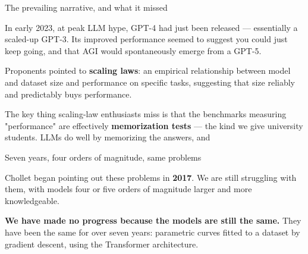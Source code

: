 \documentclass[aspectratio=169,11pt,t]{beamer}
\begin{document}
\begin{frame}[shrink=25]{The prevailing narrative, and what it missed}
{\fontsize{9.4}{12.6}\selectfont\color{fg2}In early 2023, at peak LLM hype, GPT-4 had just been released --- essentially a scaled-up GPT-3. Its improved performance seemed to suggest you could just keep going, and that AGI would spontaneously emerge from a GPT-5.\par}\vskip 4pt
{\fontsize{9.4}{12.6}\selectfont\color{fg2}Proponents pointed to \textbf{scaling laws}: an empirical relationship between model and dataset size and performance on specific tasks, suggesting that size reliably and predictably buys performance.\par}\vskip 4pt
\begin{iband}[signal]
The key thing scaling-law enthusiasts miss is that the benchmarks measuring "performance" are effectively \textbf{memorization tests} --- the kind we give university students. LLMs do well by memorizing the answers, and 
\end{iband}
\end{frame}

\begin{frame}[shrink=25]{Seven years, four orders of magnitude, same problems}
{\fontsize{9.4}{12.6}\selectfont\color{fg2}Chollet began pointing out these problems in \textbf{2017}. We are still struggling with them, with models four or five orders of magnitude larger and more knowledgeable.\par}\vskip 4pt
\begin{iband}[signal]
\textbf{We have made no progress because the models are still the same.} They have been the same for over seven years: parametric curves fitted to a dataset by gradient descent, using the Transformer architecture.
\end{iband}
\end{frame}
\end{document}

